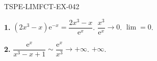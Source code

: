 \begin{corrige}{TSPE-LIMFCT-EX-042}

\textbf{1.} $(2x^3-x)\mathrm{e}^{-x} = \dfrac{2x^3-x}{\mathrm{e}^x}$. $\dfrac{x^3}{\mathrm{e}^x} \to 0$. $\boxed{\lim = 0}$.

\textbf{2.} $\dfrac{\mathrm{e}^x}{x^3-x+1} \sim \dfrac{\mathrm{e}^x}{x^3} \to +\infty$. $\boxed{+\infty}$.

\end{corrige}
